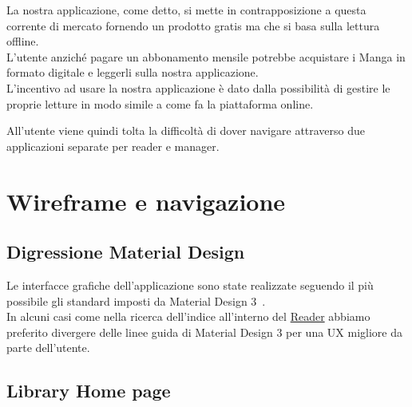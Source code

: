 \documentclass{report}
\begin{document}
La nostra applicazione, come detto, si mette in contrapposizione a
questa corrente di mercato fornendo un prodotto gratis ma che si basa
sulla lettura offline.\\
L'utente anziché pagare un abbonamento mensile potrebbe acquistare i
Manga in formato digitale e leggerli sulla nostra applicazione.\\
L'incentivo ad usare la nostra applicazione è dato dalla possibilità di
gestire le proprie letture in modo simile a come fa la piattaforma
online.

All'utente viene quindi tolta la difficoltà di dover navigare attraverso
due applicazioni separate per reader e manager.

\chapter{Wireframe e navigazione}

\section{Digressione Material Design}

Le interfacce grafiche dell'applicazione sono state realizzate seguendo il più possibile gli standard imposti da Material Design 3~\cite{matDes}.\\
In alcuni casi come nella ricerca dell'indice all'interno del \hyperref[sec:raeder]{Reader} abbiamo preferito divergere delle linee guida di Material Design 3 per una UX migliore da parte dell'utente.

\section{Library \- Home page}\label{sec:home}
\end{document}
